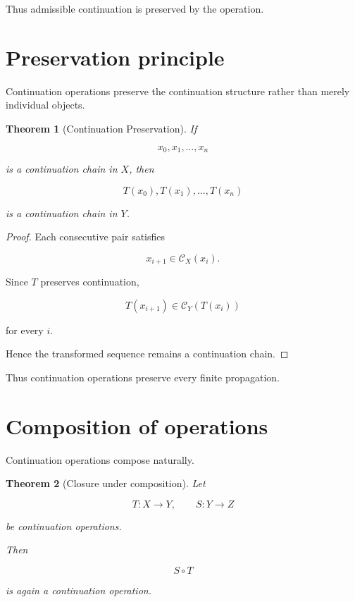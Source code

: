 \documentclass[13pt,openany]{book}
\theoremstyle{plain}
\newtheorem{theorem}{Theorem}[chapter]
\theoremstyle{definition}
\begin{document}
Thus admissible continuation is preserved by the operation.

\section{Preservation principle}

Continuation operations preserve the continuation structure rather than merely
individual objects.

\begin{theorem}[Continuation Preservation]
If

\[
x_0,x_1,\ldots,x_n
\]

is a continuation chain in \(X\), then

\[
T(x_0),T(x_1),\ldots,T(x_n)
\]

is a continuation chain in \(Y\).
\end{theorem}

\begin{proof}

Each consecutive pair satisfies

\[
x_{i+1}\in\mathcal C_X(x_i).
\]

Since \(T\) preserves continuation,

\[
T(x_{i+1})
\in
\mathcal C_Y(T(x_i))
\]

for every \(i\).

Hence the transformed sequence remains a continuation chain.

\end{proof}

Thus continuation operations preserve every finite propagation.

\section{Composition of operations}

Continuation operations compose naturally.

\begin{theorem}[Closure under composition]

Let

\[
T:X\longrightarrow Y,
\qquad
S:Y\longrightarrow Z
\]

be continuation operations.

Then

\[
S\circ T
\]

is again a continuation operation.

\end{theorem}
\end{document}
